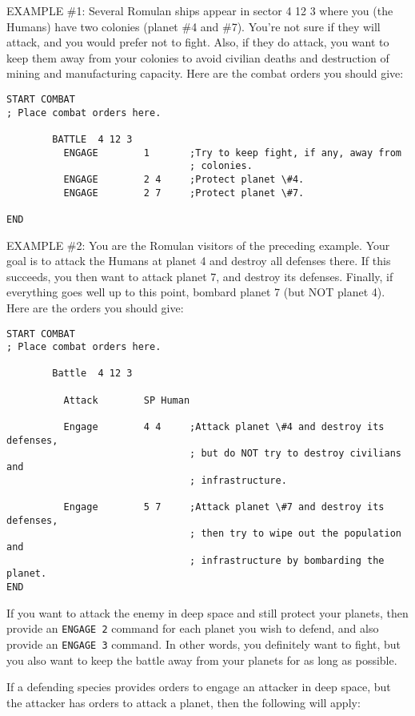 \documentclass[10pt,titlepage]{article}
\begin{document}
EXAMPLE \#1: Several Romulan ships appear in sector 4 12 3 where you (the
Humans) have two colonies (planet \#4 and \#7).  You're not sure if they will
attack, and you would prefer not to fight.  Also, if they do attack, you want
to keep them away from your colonies to avoid civilian deaths and destruction
of mining and manufacturing capacity.  Here are the combat orders you should
give:

\begin{verbatim}
START COMBAT
; Place combat orders here.

        BATTLE  4 12 3
          ENGAGE        1       ;Try to keep fight, if any, away from
                                ; colonies.
          ENGAGE        2 4     ;Protect planet \#4.
          ENGAGE        2 7     ;Protect planet \#7.

END\end{verbatim} 

EXAMPLE \#2: You are the Romulan visitors of the preceding example.  Your goal
is to attack the Humans at planet 4 and destroy all defenses there.  If this
succeeds, you then want to attack planet 7, and destroy its defenses.  Finally,
if everything goes well up to this point, bombard planet 7 (but NOT planet 4).
Here are the orders you should give:

\begin{verbatim}
START COMBAT
; Place combat orders here.

        Battle  4 12 3

          Attack        SP Human

          Engage        4 4     ;Attack planet \#4 and destroy its defenses,
                                ; but do NOT try to destroy civilians and
                                ; infrastructure.

          Engage        5 7     ;Attack planet \#7 and destroy its defenses,
                                ; then try to wipe out the population and
                                ; infrastructure by bombarding the planet.
END\end{verbatim} 

If you want to attack the enemy in deep space and still protect your planets,
then provide an \texttt{ENGAGE 2} command for each planet you wish to defend, and also
provide an \texttt{ENGAGE 3} command.  In other words, you definitely want to fight,
but you also want to keep the battle away from your planets for as long as
possible.

If a defending species provides orders to engage an attacker in deep space, but
the attacker has orders to attack a planet, then the following will apply:
\end{document}
